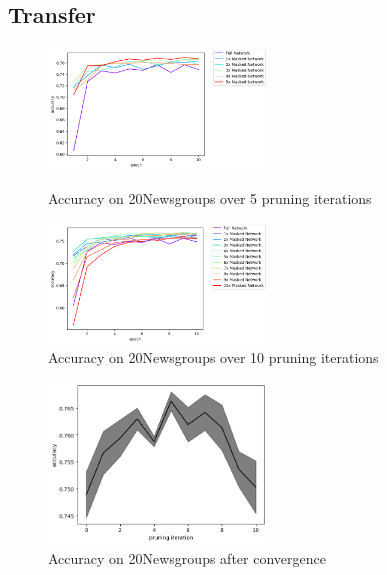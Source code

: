 \subsection*{Transfer}
\begin{figure}
	\begin{minipage}{0.5\textwidth}
		\centering
		\includegraphics[width=220px]{gfx/Experiments/Transfer-20Newsgroups-CNN/accuracy/5_iterations.png}
		\caption*{Accuracy on 20Newsgroups over 5 pruning iterations}
		\label{fig:CIFAR10accuracy10}
	\end{minipage}\hfill
	\begin{minipage}{0.5\textwidth}
		\centering
		\includegraphics[width=220px]{gfx/Experiments/Transfer-20Newsgroups-CNN/accuracy/10_iterations.png}
		\caption*{Accuracy on 20Newsgroups over 10 pruning iterations}
		\label{fig:CIFAR10accuracy15}
	\end{minipage}
\end{figure}
\begin{figure}
	\begin{minipage}{0.5\textwidth}
		\centering
		\includegraphics[width=220px]{gfx/Experiments/Transfer-20Newsgroups-CNN/accuracy/converged.png}
		\caption*{Accuracy on 20Newsgroups after convergence}
		\label{?}
	\end{minipage}\hfill
	\begin{minipage}{0.5\textwidth}
		\centering
	\end{minipage}
\end{figure}

